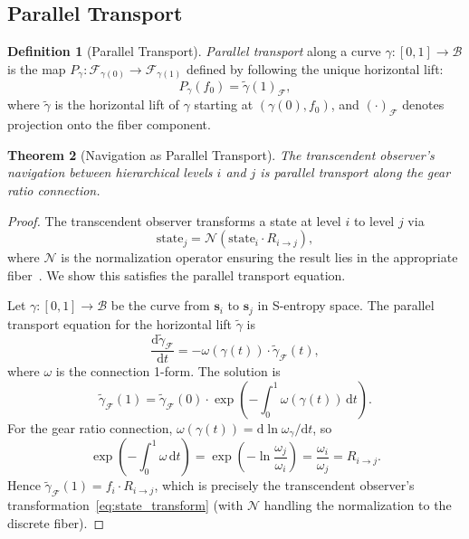 \documentclass[11pt,twocolumn,a4paper]{article}
\newtheorem{theorem}{Theorem}[section]
\theoremstyle{definition}
\newtheorem{definition}[theorem]{Definition}
\newcommand{\Fib}{\mathcal{F}}
\newcommand{\Bsp}{\mathcal{B}}
\newcommand{\dif}{\mathrm{d}}
\newcommand{\Rij}{R_{i \to j}}
\begin{document}
\subsection{Parallel Transport}\label{sec:fb:parallel}

\begin{definition}[Parallel Transport]\label{def:parallel_transport}
\emph{Parallel transport} along a curve $\gamma: [0,1] \to \Bsp$ is the map
$P_\gamma: \Fib_{\gamma(0)} \to \Fib_{\gamma(1)}$ defined by following the unique
horizontal lift:
\begin{equation}\label{eq:parallel_transport}
  P_\gamma(f_0) = \tilde{\gamma}(1)_{\Fib},
\end{equation}
where $\tilde{\gamma}$ is the horizontal lift of $\gamma$ starting at $(\gamma(0), f_0)$,
and $(\cdot)_{\Fib}$ denotes projection onto the fiber component.
\end{definition}

\begin{theorem}[Navigation as Parallel Transport]\label{thm:nav_parallel}
The transcendent observer's navigation between hierarchical levels $i$ and $j$ is
parallel transport along the gear ratio connection.
\end{theorem}

\begin{proof}
The transcendent observer transforms a state at level $i$ to level $j$ via
\begin{equation}\label{eq:state_transform}
  \text{state}_j = \mathcal{N}(\text{state}_i \cdot \Rij),
\end{equation}
where $\mathcal{N}$ is the normalization operator ensuring the result lies in the
appropriate fiber~\cite{sachikonye2024a}. We show this satisfies the parallel transport
equation.

Let $\gamma: [0,1] \to \Bsp$ be the curve from $\mathbf{s}_i$ to $\mathbf{s}_j$ in
S-entropy space. The parallel transport equation for the horizontal lift $\tilde{\gamma}$
is
\begin{equation}\label{eq:pt_equation}
  \frac{\dif \tilde{\gamma}_{\Fib}}{\dif t} = -\omega(\gamma(t)) \cdot \tilde{\gamma}_{\Fib}(t),
\end{equation}
where $\omega$ is the connection 1-form. The solution is
\begin{equation}
  \tilde{\gamma}_{\Fib}(1) = \tilde{\gamma}_{\Fib}(0) \cdot
  \exp\!\left(-\int_0^1 \omega(\gamma(t)) \, \dif t\right).
\end{equation}
For the gear ratio connection, $\omega(\gamma(t)) = \dif \ln \omega_\gamma / \dif t$, so
\begin{equation}
  \exp\!\left(-\int_0^1 \omega \, \dif t\right) = \exp\!\left(-\ln\frac{\omega_j}{\omega_i}\right)
  = \frac{\omega_i}{\omega_j} = \Rij.
\end{equation}
Hence $\tilde{\gamma}_{\Fib}(1) = f_i \cdot \Rij$, which is precisely the transcendent
observer's transformation~\eqref{eq:state_transform} (with $\mathcal{N}$ handling the
normalization to the discrete fiber).
\end{proof}
\end{document}
